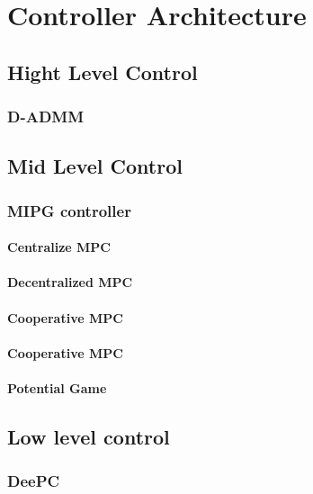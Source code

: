 \chapter{Controller Architecture}
\section{Hight Level Control}

\subsection{D-ADMM}





\section{Mid Level Control}
\subsection{MIPG controller}

\subsubsection{Centralize MPC}

\subsubsection{Decentralized MPC}

\subsubsection{Cooperative MPC}

\subsubsection{Cooperative MPC}

\subsubsection{Potential Game}


\section{Low level control}

\subsection{DeePC}




